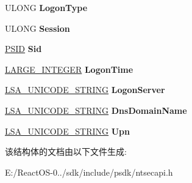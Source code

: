 \begin{DoxyCompactItemize}
\item 
\mbox{\label{struct___s_e_c_u_r_i_t_y___l_o_g_o_n___s_e_s_s_i_o_n___d_a_t_a_a5aff79d1a193422f7f48f144a26f7cab}} 
U\+L\+O\+NG {\bfseries Logon\+Type}
\item 
\mbox{\label{struct___s_e_c_u_r_i_t_y___l_o_g_o_n___s_e_s_s_i_o_n___d_a_t_a_aaf4f17e45b7f7bc0f0148c6384e5c222}} 
U\+L\+O\+NG {\bfseries Session}
\item 
\mbox{\label{struct___s_e_c_u_r_i_t_y___l_o_g_o_n___s_e_s_s_i_o_n___d_a_t_a_abd5af5277a64d109ad3c0629128f9ce9}} 
\hyperlink{struct___s_i_d}{P\+S\+ID} {\bfseries Sid}
\item 
\mbox{\label{struct___s_e_c_u_r_i_t_y___l_o_g_o_n___s_e_s_s_i_o_n___d_a_t_a_a1da3d6fe570d4270896bf3e08e6a8b78}} 
\hyperlink{union___l_a_r_g_e___i_n_t_e_g_e_r}{L\+A\+R\+G\+E\+\_\+\+I\+N\+T\+E\+G\+ER} {\bfseries Logon\+Time}
\item 
\mbox{\label{struct___s_e_c_u_r_i_t_y___l_o_g_o_n___s_e_s_s_i_o_n___d_a_t_a_a5c0d825de3abe39e402cb0c5c4d9ad4c}} 
\hyperlink{struct___l_s_a___u_n_i_c_o_d_e___s_t_r_i_n_g}{L\+S\+A\+\_\+\+U\+N\+I\+C\+O\+D\+E\+\_\+\+S\+T\+R\+I\+NG} {\bfseries Logon\+Server}
\item 
\mbox{\label{struct___s_e_c_u_r_i_t_y___l_o_g_o_n___s_e_s_s_i_o_n___d_a_t_a_a48b2c27b612d03415d458b5f7819e0f9}} 
\hyperlink{struct___l_s_a___u_n_i_c_o_d_e___s_t_r_i_n_g}{L\+S\+A\+\_\+\+U\+N\+I\+C\+O\+D\+E\+\_\+\+S\+T\+R\+I\+NG} {\bfseries Dns\+Domain\+Name}
\item 
\mbox{\label{struct___s_e_c_u_r_i_t_y___l_o_g_o_n___s_e_s_s_i_o_n___d_a_t_a_a00e6134c8890eb4c233b185fce04a233}} 
\hyperlink{struct___l_s_a___u_n_i_c_o_d_e___s_t_r_i_n_g}{L\+S\+A\+\_\+\+U\+N\+I\+C\+O\+D\+E\+\_\+\+S\+T\+R\+I\+NG} {\bfseries Upn}
\end{DoxyCompactItemize}


该结构体的文档由以下文件生成\+:\begin{DoxyCompactItemize}
\item 
E\+:/\+React\+O\+S-\/0../sdk/include/psdk/ntsecapi.\+h\end{DoxyCompactItemize}
